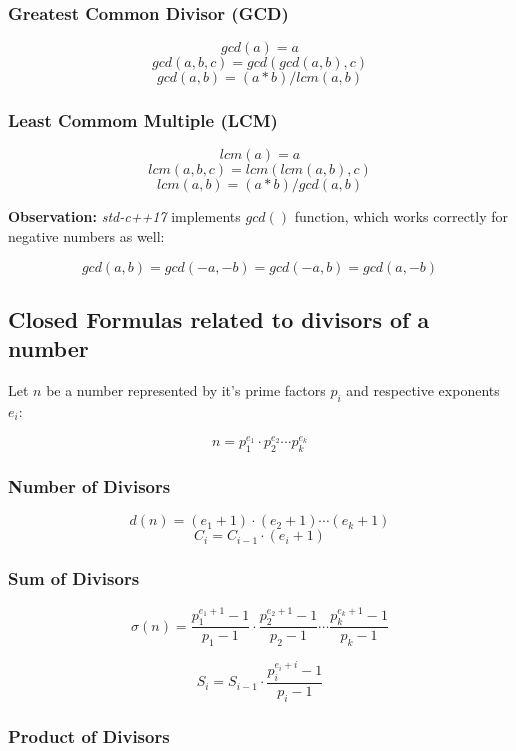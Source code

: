 	\subsubsection{Greatest Common Divisor (GCD)}
	
		$$ gcd(a) = a $$
		$$ gcd(a, b, c) = gcd( gcd(a, b), c ) $$ 
		$$ gcd(a, b) = (a*b) / lcm(a, b) $$
	
	\subsubsection{Least Commom Multiple (LCM)}
	
		$$ lcm(a) = a $$
		$$ lcm(a, b, c) = lcm( lcm(a, b), c ) $$
		$$ lcm(a, b) = (a*b) / gcd(a, b) $$
	
	\textbf{Observation:} \textit{std-c++17} implements $gcd()$ function, which works correctly for negative numbers as well:
	
	$$ gcd(a,b) = gcd(-a,-b) = gcd(-a,b) = gcd(a,-b) $$
	
\subsection{Closed Formulas related to divisors of a number}
	
	Let $n$ be a number represented by it's prime factors $p_i$ and respective exponents $e_i$:
	
	$$ n = p_1^{e_1} \cdot p_2^{e_2} \cdots p_k^{e_k} $$
	
	\subsubsection{Number of Divisors}
	
	$$ d(n) = (e_1 + 1) \cdot (e_2 + 1) \cdots (e_k + 1) $$
	$$ C_i = C_{i-1} \cdot (e_i + 1) $$
	
	\subsubsection{Sum of Divisors}
	
	$$ \sigma(n) = \frac{p_1^{e_1 + 1} - 1}{p_1 - 1} \cdot \frac{p_2^{e_2 + 1} - 1}{p_2 - 1} \cdots \frac{p_k^{e_k + 1} - 1}{p_k - 1} $$
	
	$$ S_i = S_{i-1} \cdot \frac{p_i^{e_i + i} - 1}{p_i - 1} $$
	
	\subsubsection{Product of Divisors}
	
